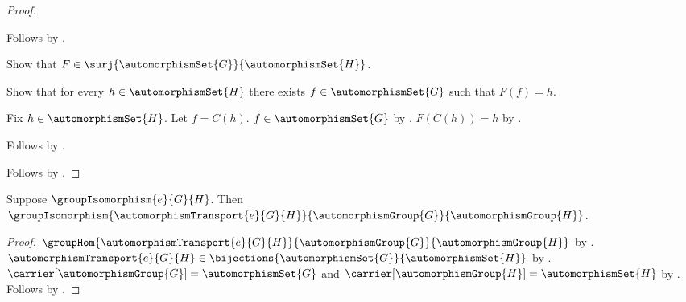 \begin{proof}
\begin{subproof}
        Follows by .
    \end{subproof}
    Show that $F\in\surj{\automorphismSet{G}}{\automorphismSet{H}}$.
    \begin{subproof}
        Show that for every $h\in\automorphismSet{H}$ there exists
            $f\in\automorphismSet{G}$ such that $F(f)=h$.
        \begin{subproof}
            Fix $h\in\automorphismSet{H}$.
            Let $f=C(h)$.
            $f\in\automorphismSet{G}$ by
                .
            $F(C(h))=h$ by .
        \end{subproof}
        Follows by .
    \end{subproof}
    Follows by .
\end{proof}

\begin{theorem}\label{automorphism_transport_group_isomorphism}
    Suppose $\groupIsomorphism{e}{G}{H}$.
    Then
        $\groupIsomorphism
            {\automorphismTransport{e}{G}{H}}
            {\automorphismGroup{G}}
            {\automorphismGroup{H}}$.
\end{theorem}
\begin{proof}
    $\groupHom
        {\automorphismTransport{e}{G}{H}}
        {\automorphismGroup{G}}
        {\automorphismGroup{H}}$ by
        .
    $\automorphismTransport{e}{G}{H}\in
        \bijections{\automorphismSet{G}}{\automorphismSet{H}}$ by
        .
    $\carrier[\automorphismGroup{G}]=\automorphismSet{G}$ and
        $\carrier[\automorphismGroup{H}]=\automorphismSet{H}$ by
        .
    Follows by .
\end{proof}
